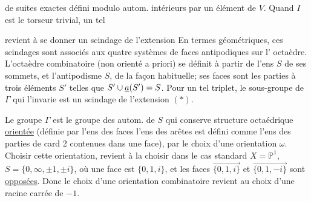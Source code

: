 de suites exactes
défini modulo autom. intérieurs par un élément de $V$.
Quand $I$ est le torseur trivial,  un tel 

revient à se donner un scindage de l'extension
En termes géométriques, ces scindages sont associés
aux quatre systèmes de  faces antipodiques sur l'
octaèdre.  L'octaèdre combinatoire (non orienté
a priori) se définit à partir de l'ens $S$ de
ses sommets, et l'antipodisme  $S$, de la façon
habituelle; ses faces sont les parties à trois éléments 
$S'$ telles que $S'\cup\uline{a}(S')=S$. Pour un tel triplet,
le sous-groupe de $\Gamma$ qui l'invarie est un scindage
de l'extension $(\ast)$.

Le groupe $\Gamma$ est le groupe des autom. de
$S$ qui conserve  structure octaédrique
\uline{orientée} (définie par l'ens  des  faces  l'ens
des arêtes  est défini comme l'ens des parties de
card 2 contenues dans une face), par le choix
d'une orientation $\omega$. Choisir cette orientation, revient 
à la choisir dans le cas standard $X=\mathbb P^1$, $S=\{0,\infty,\pm1,\pm i\}$,
où une face est $\{0,1,i\}$, et les faces  $\overrightarrow{\{0,1,i\}}$ et
$\overrightarrow{\{0,1,-i\}}$ sont \uline{opposées}. Donc le choix d'une orientation
combinatoire revient au choix d'une racine carrée de
$-1$.

